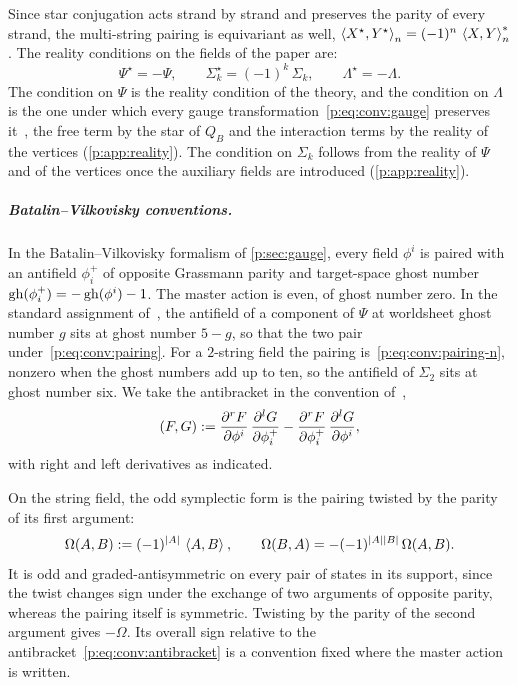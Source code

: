 Since star conjugation acts strand by strand and preserves the parity of every strand, the multi-string pairing is equivariant as well, $\pair[n]{X^\star}{Y^\star} = (-1)^n \, \pair[n]{X}{Y}^*$.
  The reality conditions on the fields of the paper are:
\begin{equation}
  \label{p:eq:conv:reality-fields}
  \Psi^\star
    = - \Psi,
  \qquad
  \Sigma_k^\star
    = (-1)^k \, \Sigma_k,
  \qquad
  \Lambda^\star
    = - \Lambda.
\end{equation}
The condition on $\Psi$ is the reality condition of the theory, and the condition on $\Lambda$ is the one under which every gauge transformation~\eqref{p:eq:conv:gauge} preserves it~\cite[eq.~(3.18)]{Zwiebach:1993:ClosedStringField}, the free term by the star of $Q_B$ and the interaction terms by the reality of the vertices (\cref{p:app:reality}).
  The condition on $\Sigma_k$ follows from the reality of $\Psi$ and of the vertices once the auxiliary fields are introduced (\cref{p:app:reality}).


\subparagraph{Batalin--Vilkovisky conventions.}

In the Batalin--Vilkovisky formalism of \cref{p:sec:gauge}, every field $\phi^i$ is paired with an antifield $\phi^+_i$ of opposite Grassmann parity and target-space ghost number $\gh(\phi^+_i) = -\gh(\phi^i) - 1$.
The master action is even, of ghost number zero.
In the standard assignment of~\cite{Zwiebach:1993:ClosedStringField}, the antifield of a component of $\Psi$ at worldsheet ghost number $g$ sits at ghost number $5 - g$, so that the two pair under~\eqref{p:eq:conv:pairing}.
For a $2$-string field the pairing is~\eqref{p:eq:conv:pairing-n}, nonzero when the ghost numbers add up to ten, so the antifield of $\Sigma_2$ sits at ghost number six.
We take the antibracket in the convention of~\cite[ch.~15]{Henneaux:1994:QuantizationGaugeSystems},
\begin{equation}
  \label{p:eq:conv:antibracket}
  (F, G)
    := \frac{\pd^r F}{\pd \phi^i} \, \frac{\pd^l G}{\pd \phi^+_i}
      - \frac{\pd^r F}{\pd \phi^+_i} \, \frac{\pd^l G}{\pd \phi^i},
\end{equation}
with right and left derivatives as indicated.

On the string field, the odd symplectic form is the pairing twisted by the parity of its first argument:
\begin{equation}
  \label{p:eq:conv:odd-symplectic}
  \Omega(A, B)
    := (-1)^{\abs{A}} \, \pair{A}{B},
  \qquad
  \Omega(B, A)
    = - (-1)^{\abs{A} \abs{B}} \, \Omega(A, B).
\end{equation}
It is odd and graded-antisymmetric on every pair of states in its support, since the twist changes sign under the exchange of two arguments of opposite parity, whereas the pairing itself is symmetric.
Twisting by the parity of the second argument gives $-\Omega$.
Its overall sign relative to the antibracket~\eqref{p:eq:conv:antibracket} is a convention fixed where the master action is written.

